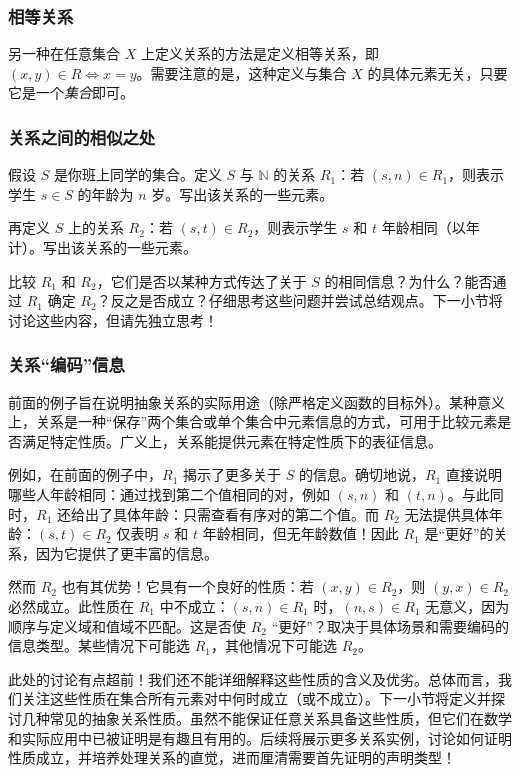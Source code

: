 \subsubsection*{相等关系}

\begin{example} \label{ex:example6.2.9}
    另一种在任意集合 $X$ 上定义关系的方法是定义相等关系，即 $(x, y) \in R \iff x = y$。需要注意的是，这种定义与集合 $X$ 的具体元素无关，只要它是一个\emph{集合}即可。
\end{example}

\subsubsection*{关系之间的相似之处}

\begin{example}
    假设 $S$ 是你班上同学的集合。定义 $S$ 与 $\mathbb{N}$ 的关系 $R_1$：若 $(s, n) \in R_1$，则表示学生 $s \in S$ 的年龄为 $n$ 岁。写出该关系的一些元素。

    再定义 $S$ 上的关系 $R_2$：若 $(s, t) \in R_2$，则表示学生 $s$ 和 $t$ 年龄相同（以年计）。写出该关系的一些元素。

    比较 $R_1$ 和 $R_2$，它们是否以某种方式传达了关于 $S$ 的相同信息？为什么？能否通过 $R_1$ 确定 $R_2$？反之是否成立？仔细思考这些问题并尝试总结观点。下一小节将讨论这些内容，但请先独立思考！
\end{example}

\subsubsection*{关系``编码''信息}

前面的例子旨在说明抽象关系的实际用途（除严格定义函数的目标外）。某种意义上，关系是一种``保存''两个集合或单个集合中元素信息的方式，可用于比较元素是否满足特定性质。广义上，关系能提供元素在特定性质下的表征信息。

例如，在前面的例子中，$R_1$ 揭示了更多关于 $S$ 的信息。确切地说，$R_1$ 直接说明哪些人年龄相同：通过找到第二个值相同的对，例如 $(s, n)$ 和 $(t, n)$。与此同时，$R_1$ 还给出了具体年龄：只需查看有序对的第二个值。而 $R_2$ 无法提供具体年龄：$(s, t) \in R_2$ 仅表明 $s$ 和 $t$ 年龄相同，但无年龄数值！因此 $R_1$ 是``更好''的关系，因为它提供了更丰富的信息。

然而 $R_2$ 也有其优势！它具有一个良好的性质：若 $(x, y) \in R_2$，则 $(y, x) \in R_2$ 必然成立。此性质在 $R_1$ 中不成立：$(s, n) \in R_1$ 时，$(n, s) \in R_1$ 无意义，因为顺序与定义域和值域不匹配。这是否使 $R_2$ ``更好''？取决于具体场景和需要编码的信息类型。某些情况下可能选 $R_1$，其他情况下可能选 $R_2$。


此处的讨论有点超前！我们还不能详细解释这些性质的含义及优劣。总体而言，我们关注这些性质在集合所有元素对中何时成立（或不成立）。下一小节将定义并探讨几种常见的抽象关系性质。虽然不能保证任意关系具备这些性质，但它们在数学和实际应用中已被证明是有趣且有用的。后续将展示更多关系实例，讨论如何证明性质成立，并培养处理关系的直觉，进而厘清需要首先证明的声明类型！